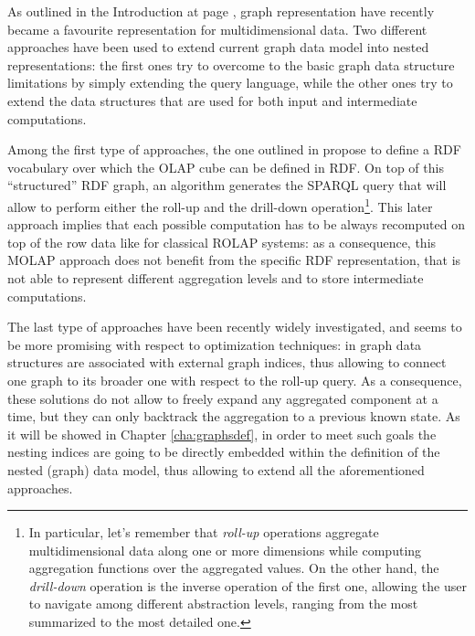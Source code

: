 As outlined in the Introduction at page \pageref{molap}, graph representation have recently became a favourite representation for multidimensional data. Two different approaches have been used to extend current graph data model into nested representations:
the first ones try to overcome to the basic graph data structure limitations by simply extending the query language, while the other ones try to extend the data structures that are used for both input and intermediate computations. 


Among the first type of approaches, the one outlined in \cite{Etcheverry2012} propose to define a RDF vocabulary over which the OLAP cube can be defined in RDF. On top of this ``structured'' RDF graph, an algorithm generates the SPARQL query that will allow to perform either the roll-up and the drill-down operation\footnote{In particular, let's remember that \textit{roll-up} operations aggregate multidimensional data along one or more dimensions while computing aggregation functions over the aggregated values. On the other hand, the \textit{drill-down} operation is the inverse operation of the first one, allowing the user to navigate among different abstraction levels, ranging from the most summarized to the most detailed one.}. This later approach implies that each possible computation has to be always recomputed on top of the row data like for classical ROLAP systems: as a consequence, this MOLAP approach does not benefit from the specific RDF representation, that is not able to represent different aggregation levels and to store intermediate computations.

The last type of approaches have been recently widely investigated, and seems to be more promising with respect to optimization techniques: in \cite{Tian20085,ChenYZHY08,Qu2011} graph data structures are associated with external graph indices, thus allowing to connect one graph  to its broader one with respect to the roll-up query. As a consequence, these solutions do not allow to freely expand any aggregated component at a time, but they can only backtrack the aggregation to a previous known state. %
As it will be showed in Chapter \ref{cha:graphsdef}, in order to meet such goals the nesting indices are going to be directly embedded within the definition of the nested (graph) data model, thus allowing to extend all the aforementioned approaches.